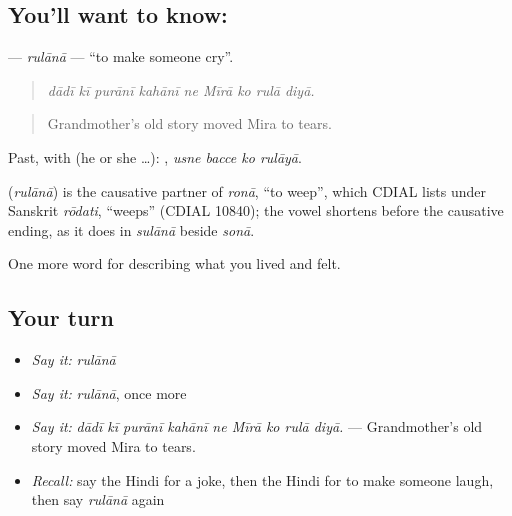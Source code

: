 \subsection*{You'll want to know: }
\textbf{} — \emph{rulānā} — \textquotedblleft{}to make someone cry\textquotedblright{}.

\begin{quote}
        
\end{quote}

\begin{quote}
\emph{dādī kī purānī kahānī ne Mīrā ko rulā diyā.}
\end{quote}

\begin{quote}
Grandmother's old story moved Mira to tears.
\end{quote}

Past, with  (he or she …):    , \emph{usne bacce ko rulāyā}.

\begin{cousinweb}
\textbf{} (\emph{rulānā}) is the causative partner of \emph{ronā}, \textquotedblleft{}to weep\textquotedblright{}, which CDIAL lists under Sanskrit \emph{rōdati}, \textquotedblleft{}weeps\textquotedblright{} (CDIAL 10840); the vowel shortens before the causative ending, as it does in \emph{sulānā} beside \emph{sonā}.
\end{cousinweb}

\begin{grammarlens}[title={What you've built}]
One more word for describing what you lived and felt.
\end{grammarlens}

\subsection*{Your turn}
\begin{itemize}
\raggedright
  \item \emph{Say it:} \emph{rulānā}
  \item \emph{Say it:} \emph{rulānā}, once more
  \item \emph{Say it:} \emph{dādī kī purānī kahānī ne Mīrā ko rulā diyā.} — Grandmother's old story moved Mira to tears.
  \item \emph{Recall:} say the Hindi for a joke, then the Hindi for to make someone laugh, then say \emph{rulānā} again
\end{itemize}

